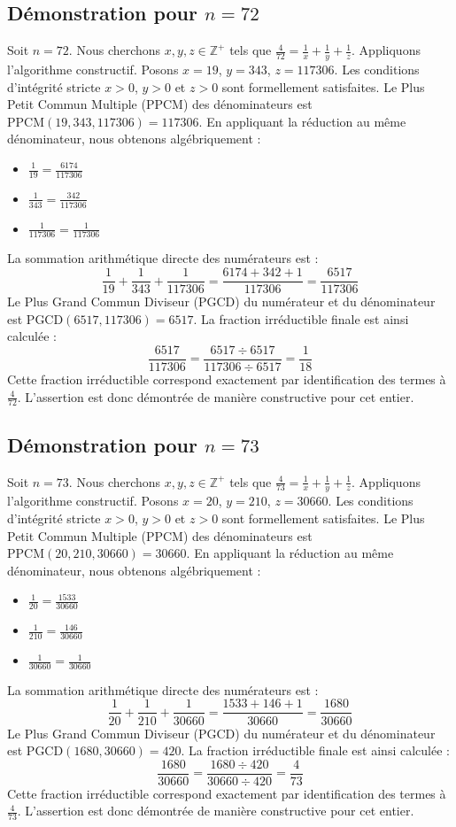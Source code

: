 \documentclass[11pt,a4paper]{article}
\begin{document}
\subsection{Démonstration pour $n = 72$}
Soit $n = 72$. Nous cherchons $x, y, z \in \mathbb{Z}^{+}$ tels que $\frac{4}{72} = \frac{1}{x} + \frac{1}{y} + \frac{1}{z}$.
Appliquons l'algorithme constructif. Posons $x = 19$, $y = 343$, $z = 117306$.
Les conditions d'intégrité stricte $x > 0$, $y > 0$ et $z > 0$ sont formellement satisfaites.
Le Plus Petit Commun Multiple (PPCM) des dénominateurs est $\text{PPCM}(19, 343, 117306) = 117306$.
En appliquant la réduction au même dénominateur, nous obtenons algébriquement :
\begin{itemize}
    \item $\frac{1}{19} = \frac{6174}{117306}$
    \item $\frac{1}{343} = \frac{342}{117306}$
    \item $\frac{1}{117306} = \frac{1}{117306}$
\end{itemize}
La sommation arithmétique directe des numérateurs est :
$$ \frac{1}{19} + \frac{1}{343} + \frac{1}{117306} = \frac{6174 + 342 + 1}{117306} = \frac{6517}{117306} $$
Le Plus Grand Commun Diviseur (PGCD) du numérateur et du dénominateur est $\text{PGCD}(6517, 117306) = 6517$.
La fraction irréductible finale est ainsi calculée :
$$ \frac{6517}{117306} = \frac{6517 \div 6517}{117306 \div 6517} = \frac{1}{18} $$
Cette fraction irréductible correspond exactement par identification des termes à $\frac{4}{72}$. L'assertion est donc démontrée de manière constructive pour cet entier.

\subsection{Démonstration pour $n = 73$}
Soit $n = 73$. Nous cherchons $x, y, z \in \mathbb{Z}^{+}$ tels que $\frac{4}{73} = \frac{1}{x} + \frac{1}{y} + \frac{1}{z}$.
Appliquons l'algorithme constructif. Posons $x = 20$, $y = 210$, $z = 30660$.
Les conditions d'intégrité stricte $x > 0$, $y > 0$ et $z > 0$ sont formellement satisfaites.
Le Plus Petit Commun Multiple (PPCM) des dénominateurs est $\text{PPCM}(20, 210, 30660) = 30660$.
En appliquant la réduction au même dénominateur, nous obtenons algébriquement :
\begin{itemize}
    \item $\frac{1}{20} = \frac{1533}{30660}$
    \item $\frac{1}{210} = \frac{146}{30660}$
    \item $\frac{1}{30660} = \frac{1}{30660}$
\end{itemize}
La sommation arithmétique directe des numérateurs est :
$$ \frac{1}{20} + \frac{1}{210} + \frac{1}{30660} = \frac{1533 + 146 + 1}{30660} = \frac{1680}{30660} $$
Le Plus Grand Commun Diviseur (PGCD) du numérateur et du dénominateur est $\text{PGCD}(1680, 30660) = 420$.
La fraction irréductible finale est ainsi calculée :
$$ \frac{1680}{30660} = \frac{1680 \div 420}{30660 \div 420} = \frac{4}{73} $$
Cette fraction irréductible correspond exactement par identification des termes à $\frac{4}{73}$. L'assertion est donc démontrée de manière constructive pour cet entier.
\end{document}
